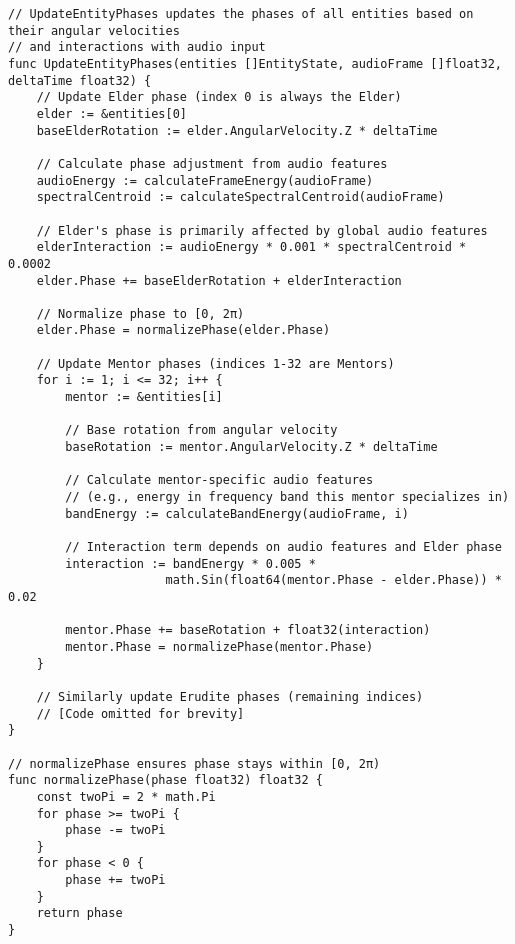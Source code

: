 \begin{tcolorbox}[colback=CodeBackground, colframe=DarkGray, title=Phase Evolution Code in Go, fonttitle=\bfseries]
\begin{verbatim}
// UpdateEntityPhases updates the phases of all entities based on their angular velocities
// and interactions with audio input
func UpdateEntityPhases(entities []EntityState, audioFrame []float32, deltaTime float32) {
    // Update Elder phase (index 0 is always the Elder)
    elder := &entities[0]
    baseElderRotation := elder.AngularVelocity.Z * deltaTime
    
    // Calculate phase adjustment from audio features
    audioEnergy := calculateFrameEnergy(audioFrame)
    spectralCentroid := calculateSpectralCentroid(audioFrame)
    
    // Elder's phase is primarily affected by global audio features
    elderInteraction := audioEnergy * 0.001 * spectralCentroid * 0.0002
    elder.Phase += baseElderRotation + elderInteraction
    
    // Normalize phase to [0, 2π)
    elder.Phase = normalizePhase(elder.Phase)
    
    // Update Mentor phases (indices 1-32 are Mentors)
    for i := 1; i <= 32; i++ {
        mentor := &entities[i]
        
        // Base rotation from angular velocity
        baseRotation := mentor.AngularVelocity.Z * deltaTime
        
        // Calculate mentor-specific audio features 
        // (e.g., energy in frequency band this mentor specializes in)
        bandEnergy := calculateBandEnergy(audioFrame, i)
        
        // Interaction term depends on audio features and Elder phase
        interaction := bandEnergy * 0.005 * 
                      math.Sin(float64(mentor.Phase - elder.Phase)) * 0.02
        
        mentor.Phase += baseRotation + float32(interaction)
        mentor.Phase = normalizePhase(mentor.Phase)
    }
    
    // Similarly update Erudite phases (remaining indices)
    // [Code omitted for brevity]
}

// normalizePhase ensures phase stays within [0, 2π)
func normalizePhase(phase float32) float32 {
    const twoPi = 2 * math.Pi
    for phase >= twoPi {
        phase -= twoPi
    }
    for phase < 0 {
        phase += twoPi
    }
    return phase
}
\end{verbatim}
\end{tcolorbox}

